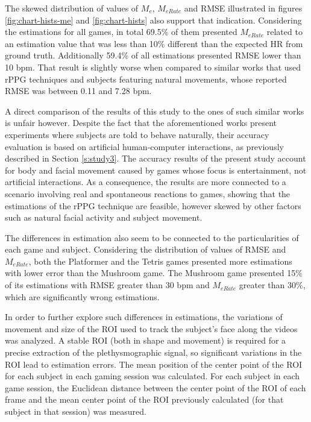 The skewed distribution of values of $M_e$, $M_{eRate}$ and RMSE illustrated in figures \ref{fig:chart-hists-me} and \ref{fig:chart-hists} also support that indication. Considering the estimations for all games, in total 69.5\% of them presented $M_{eRate}$ related to an estimation value that was less than 10\% different than the expected HR from ground truth. Additionally 59.4\% of all estimations presented RMSE lower than 10 bpm. That result is slightly worse when compared to similar works that used rPPG techniques and subjects featuring natural movements, whose reported RMSE was between 0.11 and 7.28 bpm.

A direct comparison of the results of this study to the ones of such similar works is unfair however. Despite the fact that the aforementioned works present experiments where subjects are told to behave naturally, their accuracy evaluation is based on artificial human-computer interactions, as previously described in Section \ref{s:study3}. The accuracy results of the present study account for body and facial movement caused by games whose focus is entertainment, not artificial interactions. As a consequence, the results are more connected to a scenario involving real and spontaneous reactions to games, showing that the estimations of the rPPG technique are feasible, however skewed by other factors such as natural facial activity and subject movement.

The differences in estimation also seem to be connected to the particularities of each game and subject. Considering the distribution of values of RMSE and $M_{eRate}$, both the Platformer and the Tetris games presented more estimations with lower error than the Mushroom game. The Mushroom game presented 15\% of its estimations with RMSE greater than 30 bpm and $M_{eRate}$ greater than 30\%, which are significantly wrong estimations.

In order to further explore such differences in estimations, the variations of movement and size of the ROI used to track the subject's face along the videos was analyzed. A stable ROI (both in shape and movement) is required for a precise extraction of the plethysmographic signal, so significant variations in the ROI lead to estimation errors. The mean position of the center point of the ROI for each subject in each gaming session was calculated. For each subject in each game session, the Euclidean distance between the center point of the ROI of each frame and the mean center point of the ROI previously calculated (for that subject in that session) was measured.


